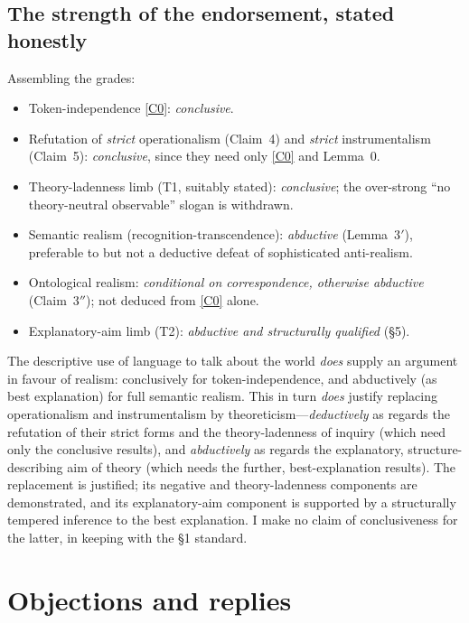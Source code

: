 \documentclass[12pt]{article}
\begin{document}
\subsection{The strength of the endorsement, stated honestly}

Assembling the grades:
\begin{itemize}[leftmargin=1.6em]
\item Token-independence \ref{C0}: \emph{conclusive}.
\item Refutation of \emph{strict} operationalism (Claim~4) and
\emph{strict} instrumentalism (Claim~5): \emph{conclusive}, since they
need only \ref{C0} and Lemma~0.
\item Theory-ladenness limb (T1, suitably stated): \emph{conclusive};
the over-strong ``no theory-neutral observable'' slogan is withdrawn.
\item Semantic realism (recognition-transcendence): \emph{abductive}
(Lemma~3$'$), preferable to but not a deductive defeat of sophisticated
anti-realism.
\item Ontological realism: \emph{conditional on correspondence, otherwise
abductive} (Claim~3$''$); not deduced from \ref{C0} alone.
\item Explanatory-aim limb (T2): \emph{abductive and structurally
qualified} (\S5).
\end{itemize}

\begin{description}[leftmargin=1.6em,style=nextline]
\item[Final verdict.] The descriptive use of language to talk about the
world \emph{does} supply an argument in favour of realism: conclusively
for token-independence, and abductively (as best explanation) for full
semantic realism. This in turn \emph{does} justify replacing
operationalism and instrumentalism by theoreticism---\emph{deductively}
as regards the refutation of their strict forms and the theory-ladenness
of inquiry (which need only the conclusive results), and \emph{abductively}
as regards the explanatory, structure-describing aim of theory (which
needs the further, best-explanation results). The replacement is
justified; its negative and theory-ladenness components are demonstrated,
and its explanatory-aim component is supported by a structurally tempered
inference to the best explanation. I make no claim of conclusiveness for
the latter, in keeping with the \S1 standard.
\end{description}

\section{Objections and replies}
\end{document}
